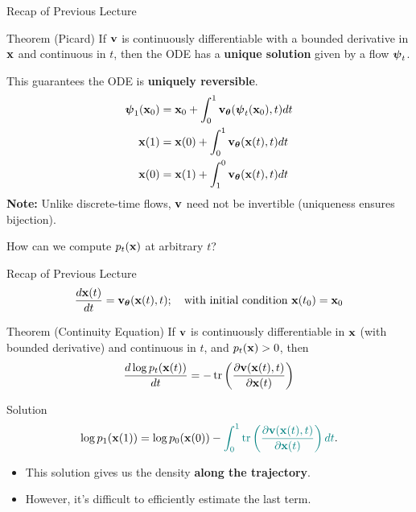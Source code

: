 \documentclass{beamer}
\begin{document}
\begin{frame}{Recap of Previous Lecture}
	\begin{block}{Theorem (Picard)}
		If $\mathbf{v}$ is continuously differentiable with a bounded derivative in $\mathbf{x}$ and continuous in $t$, then the ODE has a \textbf{unique solution} given by a flow $\boldsymbol{\psi}_t$.
	\end{block}
	This guarantees the ODE is \textbf{uniquely reversible}.
	\vspace{-0.3cm}
	\begin{align*}
		\boldsymbol{\psi}_1(\mathbf{x}_0) &= \mathbf{x}_0 + \int_{0}^{1} \mathbf{v}_{\boldsymbol{\theta}}(\boldsymbol{\psi}_t(\mathbf{x}_0), t) dt \\
		\mathbf{x}(1) &= \mathbf{x}(0) + \int_{0}^{1} \mathbf{v}_{\boldsymbol{\theta}}(\mathbf{x}(t), t) dt \\
		\mathbf{x}(0) &= \mathbf{x}(1) + \int_{1}^{0} \mathbf{v}_{\boldsymbol{\theta}}(\mathbf{x}(t), t) dt
	\end{align*}
	\textbf{Note:} Unlike discrete-time flows, $\mathbf{v}$ need not be invertible (uniqueness ensures bijection).

	How can we compute $p_t(\mathbf{x})$ at arbitrary $t$?
\end{frame}
\begin{frame}{Recap of Previous Lecture}
	\[
 		\frac{d \mathbf{x}(t)}{dt} = \mathbf{v}_{\boldsymbol{\theta}}(\mathbf{x}(t), t); \quad \text{with initial condition }\mathbf{x}(t_0) = \mathbf{x}_0
	\]
	\vspace{-0.3cm}
	\begin{block}{Theorem (Continuity Equation)}
		If $\mathbf{v}$ is continuously differentiable in $\mathbf{x}$ (with bounded derivative) and continuous in $t$, and $p_t(\mathbf{x}) > 0$, then
		\[
			\frac{d \log p_t(\mathbf{x}(t))}{d t} = - \operatorname{tr} \left( \frac{\partial \mathbf{v}(\mathbf{x}(t), t)}{\partial \mathbf{x}(t)} \right)
		\]
		\vspace{-0.5cm}
	\end{block}
	\begin{block}{Solution}
		\vspace{-0.3cm}
		\[
			\log p_1(\mathbf{x}(1)) = \log p_0(\mathbf{x}(0)) - {\color{teal}\int_{0}^{1} \operatorname{tr}  \left( \frac{\partial \mathbf{v}(\mathbf{x}(t), t)}{\partial \mathbf{x}(t)} \right) dt}.
		\]
	\end{block}
	\begin{itemize}
		\item This solution gives us the density \textbf{along the trajectory}.
		\item However, it's difficult to efficiently estimate {\color{teal}the last term}.
	 \end{itemize}
\end{frame}
\end{document}
